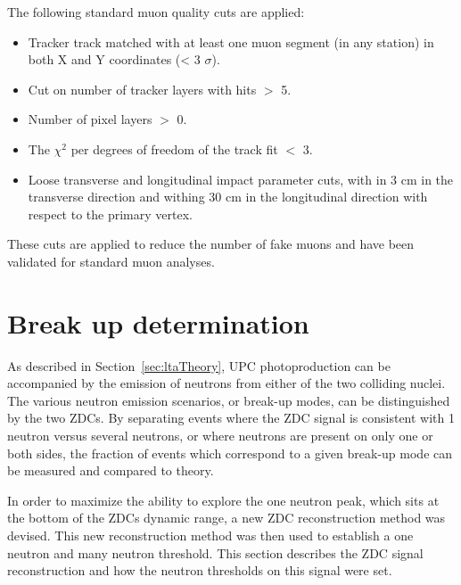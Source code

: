       The following standard muon quality cuts are applied:
      \begin{itemize}
        \item Tracker track matched with at least one muon segment 
          (in any station) in both X and Y coordinates (< 3 $\sigma$).
        \item Cut on number of tracker layers with hits $>$ 5.
        \item Number of pixel layers $>$ 0.
        \item The $\chi^{2}$ per degrees of freedom of the track fit $<$ 3. 
        \item Loose transverse and longitudinal impact parameter cuts, with in 3 
          cm in the transverse direction and withing 30 cm in the longitudinal 
          direction with respect to the primary vertex.
      \end{itemize}
      These cuts are applied to reduce the number of fake muons and have been 
        validated for standard muon analyses.

  \section{\label{sec:breakUpDet} Break up determination}
    As described in Section~\ref{sec:ltaTheory}, UPC \JPsi{} photoproduction 
      can be accompanied by the emission of neutrons from either of the two 
      colliding nuclei.
    The various neutron emission scenarios, or break-up modes, can 
      be distinguished by the two ZDCs.
    By separating events where the ZDC signal is consistent with 1 neutron 
      versus several neutrons, or where neutrons are present on only one or 
      both sides, the fraction of events which correspond to a given 
      break-up mode can be measured and compared to theory. 

    In order to maximize the ability to explore the one neutron peak, which 
      sits at the bottom of the ZDCs dynamic range, a new ZDC reconstruction 
      method was devised. 
    This new reconstruction method was then used to establish a one neutron and
      many neutron threshold.
    This section describes the ZDC signal reconstruction and how the neutron 
      thresholds on this signal were set.
    
